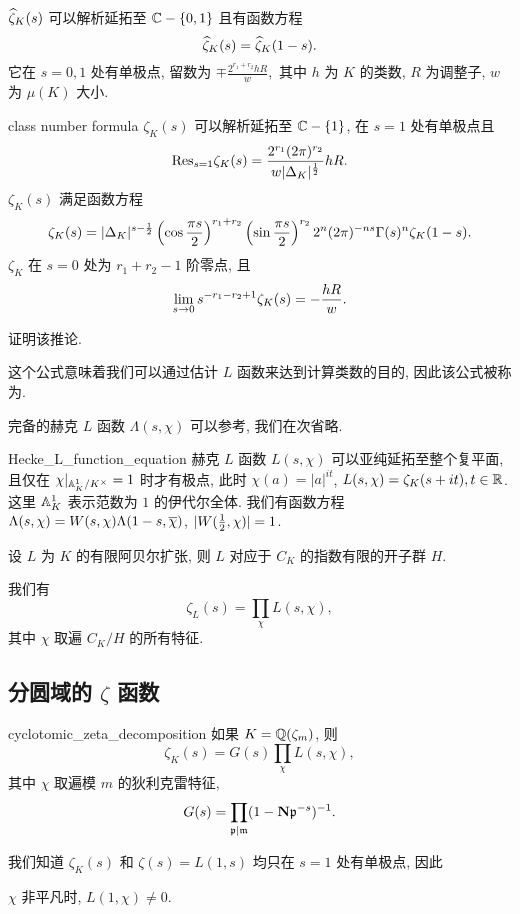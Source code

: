 \begin{theorem}{}{}
$\widehat\zeta_K(s)$ 可以解析延拓至 ${\mathbb{C}}-\left\{0,1\right\}$ 且有函数方程
  \[\widehat\zeta_K(s)=\widehat\zeta_K(1-s).\]
它在 $s=0,1$ 处有单极点, 留数为 $\mp\frac{2^{r_1+r_2}hR}{w},$ 其中 $h$ 为 $K$ 的类数, $R$ 为调整子, $w$ 为 $\mu(K)$ 大小.
\end{theorem}

\begin{corollary}{}{class number formula}
$\zeta_K(s)$ 可以解析延拓至 ${\mathbb{C}}-\left\{1\right\}$, 在 $s=1$ 处有单极点且
  \[{\mathrm{Res}}_{s=1}\zeta_K(s)=\frac{2^{r_1}(2\pi)^{r_2}}{w|\Delta_K|^{\frac{1}{2}}}hR.\]
$\zeta_K(s)$ 满足函数方程
  \[\zeta_K(s)=|\Delta_K|^{s-\frac{1}{2}}\left(\cos\frac{\pi s}{2}\right)^{r_1+r_2}\left(\sin\frac{\pi s}{2}\right)^{r_2}2^n(2\pi)^{-ns}\Gamma(s)^n\zeta_K(1-s).\]
$\zeta_K$ 在 $s=0$ 处为 $r_1+r_2-1$ 阶零点, 且
  \[\lim_{s\rightarrow 0} s^{-r_1-r_2+1}\zeta_K(s)=-\frac{hR}{w}.\]
\end{corollary}

\begin{exercise}
证明该推论.
\end{exercise}

这个公式意味着我们可以通过估计 $L$ 函数来达到计算类数的目的, 因此该公式被称为.


完备的赫克 $L$ 函数 $\Lambda(s,\chi)$ 可以参考\cite[\S 7.5]{KatoKurokawaSaito2009}, 我们在次省略.
\begin{theorem}{}{Hecke_L_function_equation}
赫克 $L$ 函数 $L(s,\chi)$ 可以亚纯延拓至整个复平面, 且仅在 $\chi|_{{\mathbb{A}}_K^1/K^\times}=1$ 时才有极点, 此时 $\chi(a)=|a|^{it}$, $L(s,\chi)=\zeta_K(s+it),t\in{\mathbb{R}}$. 这里 ${\mathbb{A}}_K^1$ 表示范数为 $1$ 的伊代尔全体.
我们有函数方程 $\Lambda(s,\chi)=W(s,\chi)\Lambda(1-s,\overline\chi)$, $|W(\frac{1}{2},\chi)|=1$.
\end{theorem}

设 $L$ 为 $K$ 的有限阿贝尔扩张, 则 $L$ 对应于 $C_K$ 的指数有限的开子群 $H$. 
\begin{theorem}{}{}
我们有
  \[\zeta_L(s)=\prod_\chi L(s,\chi),\]
其中 $\chi$ 取遍 $C_K/H$ 的所有特征.
\end{theorem}


\subsection{分圆域的 \texorpdfstring{$\zeta$}{ζ} 函数}
\begin{corollary}{}{cyclotomic_zeta_decomposition}
如果 $K={\mathbb{Q}}(\zeta_m)$, 则
  \[\zeta_K(s)=G(s)\prod_\chi L(s,\chi),\]
其中 $\chi$ 取遍模 $m$ 的狄利克雷特征, 
  \[G(s)=\prod_{{\mathfrak{p}}\mid{\mathfrak{m}}}(1-{\mathbf{N}}{\mathfrak{p}}^{-s})^{-1}.\]
\end{corollary}
我们知道 $\zeta_K(s)$ 和 $\zeta(s)=L(1,s)$ 均只在 $s=1$ 处有单极点, 因此
\begin{proposition}{}{}
$\chi$ 非平凡时, $L(1,\chi)\neq 0$.
\end{proposition}

